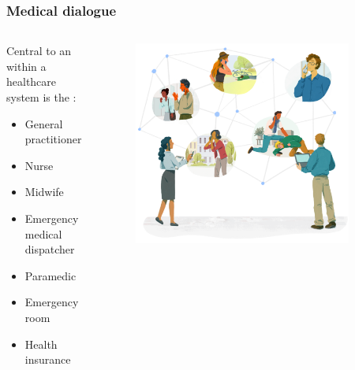 \begin{frame}[t]
    \frametitle{Medical dialogue}
    \begin{columns}[t]
        \begin{column}{0.43\textwidth}
            Central to an  within a healthcare system is the :
            \begin{itemize}
                \item <1> General practitioner
                \item <1> Nurse
                \item <1> Midwife
                \item <1> Emergency medical dispatcher
                \item <1> Paramedic
                \item <1> Emergency room
                \item <1> Health insurance
            \end{itemize}
        \end{column}
        \begin{column}{0.57\textwidth}
            \vspace{-2em}
            \begin{figure}[t]
                \centering
                \includegraphics[width=0.9\textwidth]{figures/corti_sketch_conversations.png}
            \end{figure}
        \end{column}
    \end{columns}

\end{frame}


